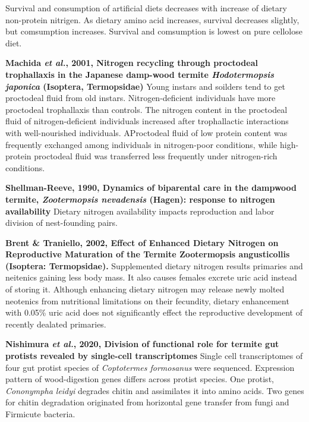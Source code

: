 \documentclass[11pt]{article}
\begin{document}
\begin{sloppypar}
Survival and consumption of artificial diets decreases with increase of dietary non-protein nitrigen. 
As dietary amino acid increases, survival decreases slightly, but comsumption increases. 
Survival and comsumption is lowest on pure cellolose diet. 
\par
\textbf{Machida \textit{et al.}, 2001, Nitrogen recycling through proctodeal trophallaxis in the Japanese damp-wood termite \textit{Hodotermopsis japonica} (Isoptera, Termopsidae)}
Young instars and soilders tend to get proctodeal fluid from old instars. 
Nitrogen-deficient individuals have more proctodeal trophallaxis than controls. 
The nitrogen content in the proctodeal fluid of nitrogen-deficient individuals increased after trophallactic interactions with well-nourished individuals.
AProctodeal fluid of low protein content was frequently exchanged among individuals in nitrogen-poor conditions, while high-protein proctodeal fluid was transferred less frequently under nitrogen-rich conditions. 
\par
\textbf{Shellman-Reeve, 1990, Dynamics of biparental care in the dampwood termite, \textit{Zootermopsis nevadensis} (Hagen): response to nitrogen availability} \newline
Dietary nitrogen availability impacts reproduction and labor division of nest-founding pairs. 
\par
\textbf{Brent & Traniello, 2002, Effect of Enhanced Dietary Nitrogen on Reproductive Maturation of the Termite Zootermopsis angusticollis (Isoptera: Termopsidae).} \newline
Supplemented dietary nitrogen results primaries and neitenics gaining less body mass. 
It also causes females excrete uric acid instead of storing it. 
Although enhancing dietary nitrogen may release newly molted neotenics from nutritional limitations on their fecundity, dietary enhancement with 0.05\% uric acid does not significantly effect the reproductive development of recently dealated primaries. 
\par
\textbf{Nishimura \textit{et al.}, 2020, Division of functional role for termite gut protists revealed by single-cell transcriptomes} \newline
Single cell transcriptomes of four gut protist species of \textit{Coptotermes formosanus} were sequenced. 
Expression pattern of wood-digestion genes differs across protist species. 
One protist, \textit{Cononympha leidyi} degrades chitin and assimilates it into amino acids. 
Two genes for chitin degradation originated from horizontal gene transfer from fungi and Firmicute bacteria.

\end{sloppypar}
\end{document}
